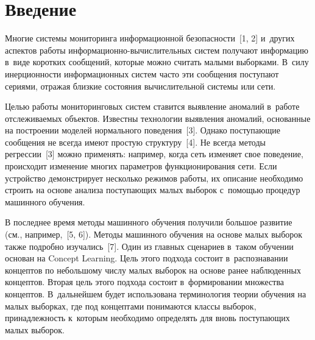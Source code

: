 
  



\thispagestyle{headings}

\begin{multicols}{2}

\label{st\stat}
  
  
\section{Введение }

  Многие системы мониторинга информационной безопасности~[1, 2] и~других 
аспектов работы ин\-фор\-ма\-ци\-он\-но-вы\-чис\-ли\-тель\-ных систем получают 
информацию в~виде коротких сообщений, которые можно считать малыми 
выборками. В~силу инерционности информационных систем часто эти 
сообщения поступают сериями, отражая близкие состояния вычислительной 
системы или сети. 
  
  Целью работы мониторинговых систем ставится выявление аномалий в~работе 
отслеживаемых объектов. Известны технологии выявления аномалий, основанные 
на построении моделей нормального поведения~[3]. Однако поступающие 
сообщения не всегда имеют простую структуру~[4]. Не всегда методы 
регрессии~[3] можно применять: например, когда сеть изменяет свое поведение, 
происходит изменение многих параметров функционирования сети. Если 
устройство демонстрирует несколько режимов работы, их описание необходимо 
строить на основе анализа поступающих малых выборок с~помощью процедур 
машинного обучения. 
  
  В последнее время методы машинного обучения получили большое развитие 
(см., например,~[5, 6]). Методы машинного обучения на основе малых выборок 
также подробно изучались~[7]. Один из главных сценариев в~таком обучении 
основан на Concept Learning. Цель этого подхода состоит в~распознавании 
концептов по небольшому числу малых выборок на основе ранее наблюденных 
концептов. Вторая цель этого подхода состоит в~формировании множества 
концептов. В~дальнейшем будет использована терминология теории обучения на 
малых выборках, где под концептами понимаются классы выборок, 
принадлежность к~которым необходимо определять для вновь поступающих 
малых выборок. 
  

\end{multicols}
